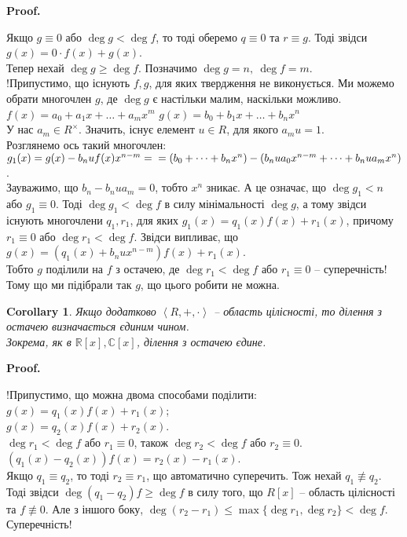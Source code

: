 \documentclass[a4paper, 10pt]{article}
\makeatletter
\theoremstyle{theoremdd}
\theoremstyle{theoremdd}
\theoremstyle{theoremdd}
\theoremstyle{theoremdd}
\theoremstyle{theoremdd}
\theoremstyle{theoremdd}
\theoremstyle{theoremdd}
\theoremstyle{theoremdd}
\theoremstyle{theoremdd}
\theoremstyle{theoremdd}
\theoremstyle{theoremdd}
\theoremstyle{theoremdd}
\theoremstyle{theoremdd}
\theoremstyle{theoremdd}
\newtheorem{corollary}[theorem]{Corollary}
\theoremstyle{theoremdd}
\renewenvironment{proof}[1][Proof.\\]{\par
\pushQED{\hfill \qed}%
\normalfont \topsep6\p@\@plus6\p@\relax
\trivlist
\item\relax
{\bfseries
#1\@addpunct{.}}\hspace\labelsep\ignorespaces
}{%
\popQED\endtrivlist\@endpefalse
}
\makeatother
\begin{document}
\begin{proof}
Якщо $g \equiv 0$ або $\deg g < \deg f$, то тоді оберемо $q \equiv 0$ та $r \equiv g$. Тоді звідси $g(x) = 0 \cdot f(x) + g(x)$.
\bigskip \\
Тепер нехай $\deg g \geq \deg f$. Позначимо $\deg g = n,\ \deg f = m$.\\
!Припустимо, що існують $f,g$, для яких твердження не виконується. Ми можемо обрати многочлен $g$, де $\deg g$ є настільки малим, наскільки можливо.\\
$f(x) = a_0 + a_1 x + \dots + a_m x^m$ \quad $g(x) = b_0 + b_1 x + \dots + b_n x^n$\\
У нас $a_m \in R^\times$. Значить, існує елемент $u \in R$, для якого $a_m u = 1$.\\
Розглянемо ось такий многочлен: \\
$g_1(x) = g(x) - b_n u f(x) x^{n-m} = \\ = (b_0 + \dots + b_n x^n) - (b_n u a_0 x^{n-m} + \dots + b_n u a_m x^n)$. \\
Зауважимо, що $b_n - b_n u a_m = 0$, тобто $x^n$ зникає. А це означає, що $\deg g_1 < n$ або $g_1 \equiv 0$. Тоді $\deg g_1 < \deg f$ в силу мінімальності $\deg g$, а тому звідси існують многочлени $q_1,r_1$, для яких $g_1(x) = q_1(x) f(x) + r_1(x)$, причому $r_1 \equiv 0$ або $\deg r_1 < \deg f$. Звідси випливає, що\\
$g(x) = (q_1(x) + b_n u x^{n-m}) f(x) + r_1(x)$.\\
Тобто $g$ поділили на $f$ з остачею, де $\deg r_1 < \deg f$ або $r_1 \equiv 0$ -- суперечність! Тому що ми підібрали так $g$, що цього робити не можна.
\end{proof}

\begin{corollary}
Якщо додатково $\left< R,+,\cdot\right>$ -- область цілісності, то ділення з остачею визначається єдиним чином.\\
\textit{Зокрема, як в $\mathbb{R}[x], \mathbb{C}[x]$, ділення з остачею єдине.}
\end{corollary}

\begin{proof}
!Припустимо, що можна двома способами поділити:\\
$g(x) = q_1(x)f(x) + r_1(x)$;\\
$g(x) = q_2(x)f(x) + r_2(x)$.\\
$\deg r_1 < \deg f$ або $r_1 \equiv 0$, також $\deg r_2 < \deg f$ або $r_2 \equiv 0$.\\
$(q_1(x)-q_2(x))f(x) = r_2(x) - r_1(x)$.\\
Якщо $q_1 \equiv q_2$, то тоді $r_2 \equiv r_1$, що автоматично суперечить. Тож нехай $q_1 \not\equiv q_2$. Тоді звідси $\deg (q_1-q_2)f \geq \deg f$ в силу того, що $R[x]$ -- область цілісності та $f \not\equiv 0$. Але з іншого боку, $\deg (r_2-r_1) \leq \max \{ \deg r_1, \deg r_2 \} < \deg f$. Суперечність!
\end{proof}
\end{document}

